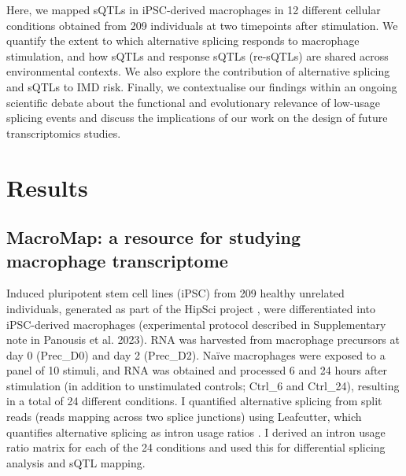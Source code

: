 Here, we mapped sQTLs in iPSC-derived macrophages in 12 different cellular conditions obtained from 209 individuals at two timepoints after stimulation. We quantify the extent to which alternative splicing responds to macrophage stimulation, and how sQTLs and response sQTLs (re-sQTLs) are shared across environmental contexts. We also explore the contribution of alternative splicing and sQTLs to IMD risk. Finally, we contextualise our findings within an ongoing scientific debate about the functional and evolutionary relevance of low-usage splicing events and discuss the implications of our work on the design of future transcriptomics studies. \\

\section{Results}

\subsection{MacroMap: a resource for studying macrophage transcriptome}

Induced pluripotent stem cell lines (iPSC) from 209 healthy unrelated individuals, generated as part of the HipSci project \cite{Kilpinen2017-qm}, were differentiated into iPSC-derived macrophages (experimental protocol described in Supplementary note in Panousis et al. 2023). RNA was harvested from macrophage precursors at day 0 (Prec\_D0) and day 2 (Prec\_D2). \linebreak
Naïve macrophages were exposed to a panel of 10 stimuli, and RNA was obtained and processed 6 and 24 hours after stimulation (in addition to unstimulated controls; Ctrl\_6 and Ctrl\_24), resulting in a total of 24 different conditions. I quantified alternative splicing from split reads (reads mapping across two splice junctions) using Leafcutter, which quantifies alternative splicing as intron usage ratios \cite{Li2018-ll}. I derived an intron usage ratio matrix for each of the 24 conditions and used this for differential splicing analysis and sQTL mapping.\\

